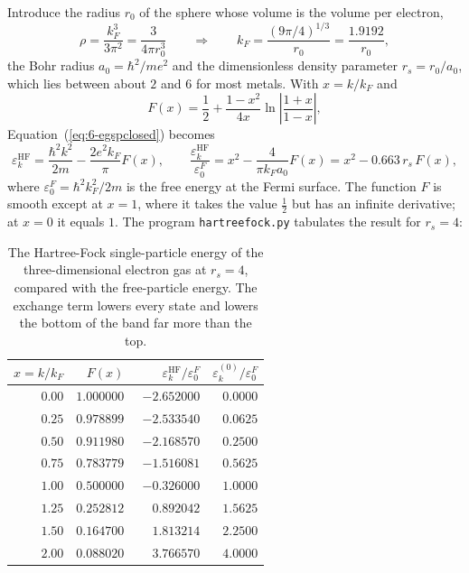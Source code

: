 Introduce the radius $r_0$ of the sphere whose volume is the volume per
electron,
\begin{equation}
  \rho = \frac{k_F^3}{3\pi^2} = \frac{3}{4\pi r_0^3}
  \qquad\Longrightarrow\qquad
  k_F = \frac{(9\pi/4)^{1/3}}{r_0} = \frac{1.9192}{r_0},
  \label{eq:6-rs}
\end{equation}
the Bohr radius $a_0=\hbar^2/me^2$ and the dimensionless density parameter
$r_s=r_0/a_0$, which lies between about $2$ and $6$ for most metals.  With
$x=k/k_F$ and
\begin{equation}
  F(x) = \frac{1}{2} + \frac{1-x^2}{4x}
    \ln\left\vert\frac{1+x}{1-x}\right\vert,
  \label{eq:6-Fx}
\end{equation}
Equation~(\ref{eq:6-egspclosed}) becomes
\begin{equation}
  \varepsilon_{k}^{\mathrm{HF}}
   = \frac{\hbar^2k^2}{2m} - \frac{2e^2k_F}{\pi}F(x),
  \qquad
  \frac{\varepsilon_{k}^{\mathrm{HF}}}{\varepsilon_0^{F}}
   = x^2 - \frac{4}{\pi k_F a_0}F(x)
   = x^2 - 0.663\,r_s\,F(x),
  \label{eq:6-egdimensionless}
\end{equation}
where $\varepsilon_0^{F}=\hbar^2k_F^2/2m$ is the free energy at the Fermi
surface.  The function $F$ is smooth except at $x=1$, where it takes the value
$\tfrac12$ but has an infinite derivative; at $x=0$ it equals $1$.  The
program \texttt{hartreefock.py} tabulates the result for $r_s=4$:

\begin{table}[h]
\centering
\renewcommand{\arraystretch}{1.2}
\setlength{\tabcolsep}{12pt}
\begin{tabular}{rrrr}
\toprule
$x=k/k_F$ & $F(x)$ & $\varepsilon_k^{\mathrm{HF}}/\varepsilon_0^{F}$
  & $\varepsilon_k^{(0)}/\varepsilon_0^{F}$\\
\midrule
$0.00$ & $1.000000$ & $-2.652000$ & $0.0000$\\
$0.25$ & $0.978899$ & $-2.533540$ & $0.0625$\\
$0.50$ & $0.911980$ & $-2.168570$ & $0.2500$\\
$0.75$ & $0.783779$ & $-1.516081$ & $0.5625$\\
$1.00$ & $0.500000$ & $-0.326000$ & $1.0000$\\
$1.25$ & $0.252812$ & $\phantom{-}0.892042$ & $1.5625$\\
$1.50$ & $0.164700$ & $\phantom{-}1.813214$ & $2.2500$\\
$2.00$ & $0.088020$ & $\phantom{-}3.766570$ & $4.0000$\\
\bottomrule
\end{tabular}
\caption{The Hartree-Fock single-particle energy of the three-dimensional
electron gas at $r_s=4$, compared with the free-particle energy.  The
exchange term lowers every state and lowers the bottom of the band far more
than the top.}
\label{tab:eghf}
\end{table}

